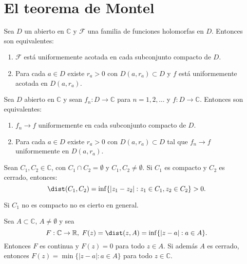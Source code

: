 \section{El teorema de Montel}
\begin{lemma}
    Sea $D$ un abierto en $\mathbb{C}$ y $\mathcal{F}$ una familia de funciones holomorfas en $D$.
    Entonces son equivalentes:
    \begin{enumerate}
        \item $\mathcal{F}$ está uniformemente acotada en cada subconjunto compacto de $D$.
        \item Para cada $a \in D$ existe $r_a > 0$ con $D(a, r_a) \subset D$ y $f$ está uniformemente acotada en $D(a, r_a)$.
    \end{enumerate}
\end{lemma}

\begin{lemma}
    Sea $D$ abierto en $\mathbb{C}$ y sean $f_n: D \to \mathbb{C}$ para $n = 1, 2, \dots$ y $f: D \to \mathbb{C}$.
    Entonces son equivalentes:
    \begin{enumerate}
        \item $f_n \to f$ uniformemente en cada subconjunto compacto de $D$.
        \item Para cada $a \in D$ existe $r_a > 0$ con $D(a, r_a) \subset D$ tal que $f_n \to f$ uniformemente en $D(a, r_a)$.
    \end{enumerate}
\end{lemma}

\begin{lemma}
    Sean $C_1, C_2 \in \mathbb{C}$, con $C_1 \cap C_2 = \emptyset$ y $C_1, C_2 \neq \emptyset$.
    Si $C_1$ es compacto y $C_2$ es cerrado, entonces:
    $$\dist(C_1, C_2) = \inf\{|z_1-z_2| : z_1 \in C_1, z_2 \in C_2\} > 0.$$
\end{lemma}

\begin{remark}
    Si $C_1$ no es compacto no es cierto en general.
\end{remark}

\begin{lemma}
    Sea $A \subset \mathbb{C}$, $A \neq \emptyset$ y sea
    $$F: \mathbb{C} \to \mathbb{R}, \; F(z) = \dist(z, A) = \inf \{|z-a| : a \in A\}.$$
    Entonces $F$ es continua y $F(z) = 0$ para todo $z \in A$.
    Si además $A$ es cerrado, entonces $F(z) = \min \{|z-a| : a \in A\}$ para todo $z \in \mathbb{C}$.
\end{lemma}

